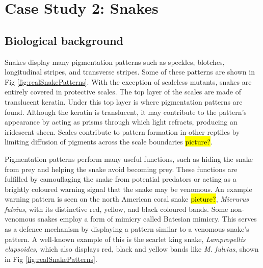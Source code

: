 

\chapter{Case Study 2: Snakes}

\section{Biological background}
Snakes display many pigmentation patterns such as speckles, blotches, longitudinal stripes, and transverse stripes. Some of these patterns are shown in Fig \ref{fig:realSnakePatterns}. With the exception of scaleless mutants, snakes are entirely covered in protective scales. The top layer of the scales are made of translucent keratin. Under this top layer is where pigmentation patterns are found. Although the keratin is translucent, it may contribute to the pattern's appearance by acting as prisms through which light refracts, producing an iridescent sheen. Scales contribute to pattern formation in other reptiles by limiting diffusion of pigments across the scale boundaries \citep{manukyan2017} \hl{picture?}.

Pigmentation patterns perform many useful functions, such as hiding the snake from prey and helping the snake avoid becoming prey. These functions are fulfilled by camouflaging the snake from potential predators or acting as a brightly coloured warning signal that the snake may be venomous. An example warning pattern is seen on the north American coral snake \hl{picture?}, \textit{Micrurus fulvius}, with its distinctive red, yellow, and black coloured bands. Some non-venomous snakes employ a form of mimicry called Batesian mimicry. This serves as a defence mechanism by displaying a pattern similar to a venomous snake's pattern. A well-known example of this is the scarlet king snake, \textit{Lampropeltis elapsoides}, which also displays red, black and yellow bands like \textit{M. fulvius}, shown in Fig \ref{fig:realSnakePatterns}.

